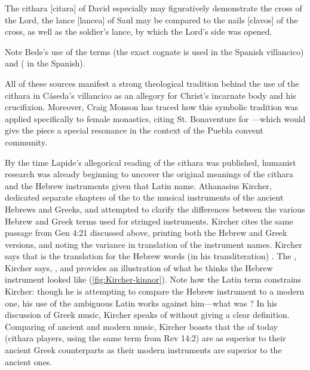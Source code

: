 \begin{quoting}
The cithara [citara] of David especially may figuratively demonstrate the cross of the Lord, the lance [lancea] of Saul may be compared to the nails [clavos] of the cross, as well as the soldier's lance, by which the Lord's side was opened.%
	\autocite[123]{Bede:Commentaries2}
\end{quoting}
%
Note Bede's use of the terms  (the exact cognate is used in the Spanish villancico) and  ( in the Spanish).

All of these sources manifest a strong theological tradition behind the use of the cithara in Cáseda's villancico as an allegory for Christ's incarnate body and his crucifixion.
Moreover, Craig Monson has traced how this symbolic tradition was applied specifically to female monastics, citing St. Bonaventure for ---which would give the piece a special resonance in the context of the Puebla convent community.%
	\autocite[93--94]{Monson:DivasConvent}

By the time Lapide's allegorical reading of the cithara was published, humanist research was already beginning to uncover the original meanings of the cithara and the Hebrew instruments given that Latin name.
Athanasius Kircher, dedicated separate chapters of the  to the musical instruments of the ancient Hebrews and Greeks, and attempted to clarify the differences between the various Hebrew and Greek terms used for stringed instruments.
Kircher cites the same passage from Gen 4:21 discussed above, printing both the Hebrew and Greek versions, and noting the variance in translation of the instrument names.
Kircher says that  is the translation for the Hebrew words (in his transliteration) .
The , Kircher says, , and provides an illustration of what he thinks the Hebrew instrument looked like (\cref{fig:Kircher-kinnor}).%
	\autocite[I:~44--49]{Kircher:Musurgia}
Note how the Latin term constrains Kircher: though he is attempting to compare the Hebrew instrument to a modern one, his use of the ambiguous Latin  works against him---what was ?
In his discussion of Greek music, Kircher speaks of  without giving a clear definition.
Comparing of ancient and modern music, Kircher boasts that the  of today (cithara players, using the same term from Rev 14:2) are as superior to their ancient Greek counterparts as their modern instruments are superior to the ancient ones.
	\autocite[I:~548]{Kircher:Musurgia}

